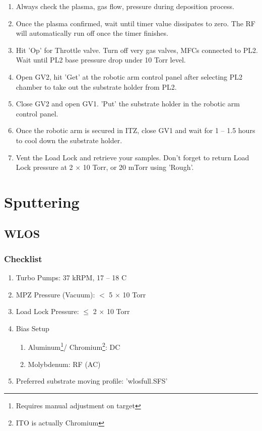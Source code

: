 \begin{enumerate}
  \item Always check the plasma, gas flow, pressure during deposition process.
  \item Once the plasma confirmed, wait until timer value dissipates to zero. The RF will automatically run off once the timer finishes. 
  \item Hit 'Op' for Throttle valve. Turn off very gas valves, MFCs connected to PL2. Wait until PL2 base pressure drop under 10 Torr level.
  \item Open GV2, hit 'Get' at the robotic arm control panel after selecting PL2 chamber to take out the substrate holder from PL2. 
  \item Close GV2 and open GV1. 'Put' the substrate holder in the robotic arm control panel.
  \item Once the robotic arm is secured in ITZ, close GV1 and wait for 1 -- 1.5 hours to cool down the substrate holder.
  \item Vent the Load Lock and retrieve your samples. Don't forget to return Load Lock pressure at 2 $\times$ 10 Torr, or 20 mTorr using 'Rough'.
\end{enumerate}

\section{Sputtering}
\subsection{WLOS}
\subsubsection{Checklist}
\begin{enumerate}
\item Turbo Pumps: 37 kRPM, 17 -- 18 C
\item MPZ Pressure (Vacuum): $<$ 5 $\times$ 10 Torr
\item Load Lock Pressure: $\leq$ 2 $\times$ 10 Torr
\item Bias Setup
  \begin{enumerate}
  \item Aluminum\footnote{Requires manual adjustment on target}/%
    Chromium\footnote{ITO is actually Chromium}: DC
  \item Molybdenum: RF (AC)		
  \end{enumerate}
\item Preferred substrate moving profile: 'wlosfull.SFS'
\end{enumerate}

